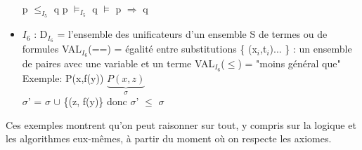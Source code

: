 \begin{itemize}
p $\leq_{I_{5}}$ q   \hspace{1.5cm} p $\models_{I_{5}}$ q \hspace{1.5cm} $\models$ p $\Rightarrow$ q
\item \underline{$I_{6}$} : D$_{I_{6}}$ = l'ensemble des unificateurs d'un ensemble S de termes ou de formules
VAL$_{I_{6}}$(==) = égalité entre substitutions \{ (x$_{i}$,t$_{i}$)... \} : un ensemble de paires avec une variable et un terme VAL$_{I_{6}}$($\leq$) = "moins général que"\\
\newline
Exemple: P(x,f(y)) \hspace{1cm} $\underbrace{P(x,z)}_{\sigma}$\\
$\sigma$' = $\sigma$ $\cup$ \{(z, f(y)\} donc 
$\sigma$' $\leq$ $\sigma$\\
\end{itemize}
Ces exemples montrent qu'on peut raisonner sur tout, y compris sur la logique et les algorithmes eux-mêmes, à partir du moment où on respecte les axiomes.